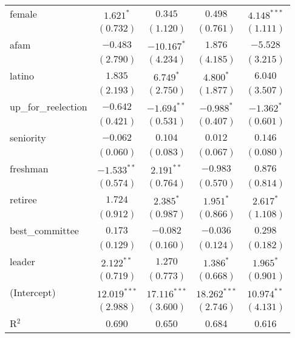 \documentclass[12pt]{article}
\begin{document}
\begin{table}
\begin{center}
\begin{tabular}{l c c c c }
			female                 & $1.621^{*}$    & $0.345$         & $0.498$        & $4.148^{***}$ \\
			& $(0.732)$      & $(1.120)$       & $(0.761)$      & $(1.111)$     \\
			afam                   & $-0.483$       & $-10.167^{*}$   & $1.876$        & $-5.528$      \\
			& $(2.790)$      & $(4.234)$       & $(4.185)$      & $(3.215)$     \\
			latino                 & $1.835$        & $6.749^{*}$     & $4.800^{*}$    & $6.040$       \\
			& $(2.193)$      & $(2.750)$       & $(1.877)$      & $(3.507)$     \\
			up\_for\_reelection    & $-0.642$       & $-1.694^{**}$   & $-0.988^{*}$   & $-1.362^{*}$  \\
			& $(0.421)$      & $(0.531)$       & $(0.407)$      & $(0.601)$     \\
			seniority              & $-0.062$       & $0.104$         & $0.012$        & $0.146$       \\
			& $(0.060)$      & $(0.083)$       & $(0.067)$      & $(0.080)$     \\
			freshman               & $-1.533^{**}$  & $2.191^{**}$    & $-0.983$       & $0.876$       \\
			& $(0.574)$      & $(0.764)$       & $(0.570)$      & $(0.814)$     \\
			retiree                & $1.724$        & $2.385^{*}$     & $1.951^{*}$    & $2.617^{*}$   \\
			& $(0.912)$      & $(0.987)$       & $(0.866)$      & $(1.108)$     \\
			best\_committee        & $0.173$        & $-0.082$        & $-0.036$       & $0.298$       \\
			& $(0.129)$      & $(0.160)$       & $(0.124)$      & $(0.182)$     \\
			leader                 & $2.122^{**}$   & $1.270$         & $1.386^{*}$    & $1.965^{*}$   \\
			& $(0.719)$      & $(0.773)$       & $(0.668)$      & $(0.901)$     \\
			(Intercept)            & $12.019^{***}$ & $17.116^{***}$  & $18.262^{***}$ & $10.974^{**}$ \\
			& $(2.988)$      & $(3.600)$       & $(2.746)$      & $(4.131)$     \\
			\hline
			R$^2$                  & 0.690          & 0.650           & 0.684          & 0.616         \\

\end{tabular}
\end{center}
\end{table}
\end{document}

